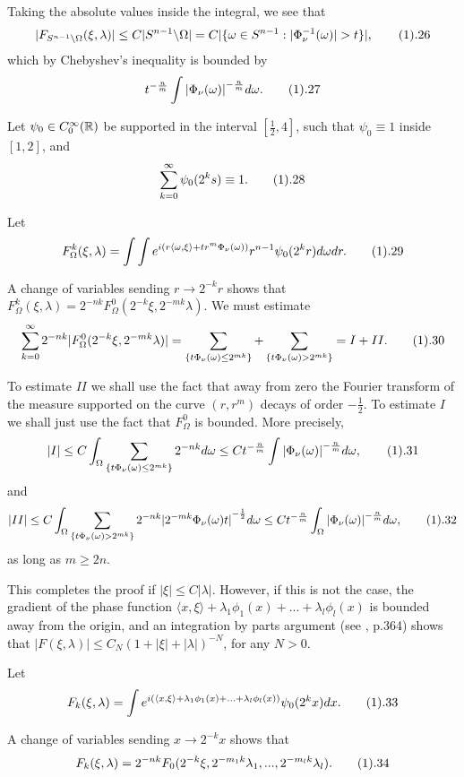 Taking the absolute values inside the integral, we see that
$$ |F_{S^{n-1}\backslash \Omega} (\xi,\lambda)| \leq 
C|S^{n-1}\backslash \Omega|=C|\{\omega \in S^{n-1}: 
|{\Phi}_{\nu}^{-1}(\omega)|>t\}|, \tag1.26$$ which by Chebyshev's 
inequality is bounded by 
$$ t^{-\frac{n}{m}} \int {|{\Phi}_{\nu}(\omega)|}^{-\frac{n}{m}} d\omega. 
\tag1.27$$  

Let ${\psi}_0\in C^{\infty}_0({\Bbb R})$ be supported in the interval 
$[\frac{1}{2}, 4]$, such that ${\psi}_0 \equiv 1$ inside $[1,2]$, and 
$$ \sum_{k=0}^{\infty} {\psi}_0(2^ks) \equiv 1. \tag1.28$$ 

Let 
$$F^{k}_{\Omega}(\xi,\lambda)=\int \int e^{i(r\langle \omega, \xi \rangle +
tr^m{\Phi}_{\nu}(\omega))} r^{n-1} {\psi}_0(2^kr) d\omega dr. \tag1.29$$ 

A change of variables sending $r \rightarrow 2^{-k}r$ shows that 
$F^{k}_{\Omega}(\xi,\lambda)=2^{-nk}F^{0}_{\Omega}(2^{-k}\xi, 2^{-mk}\lambda).$
We must estimate 
$$\sum_{k=0}^{\infty}2^{-nk}|F^{0}_{\Omega}(2^{-k}\xi, 2^{-mk}\lambda)|=
\sum_{\{t{\Phi}_{\nu}(\omega) \leq 2^{mk}\}} 
+\sum_{\{t{\Phi}_{\nu}(\omega)>2^{mk}\}}=I+II. \tag1.30$$ 

To estimate $II$ we shall use the fact that away from zero the Fourier transform
of the measure supported on the curve $(r,r^m)$ decays of order $-\frac{1}{2}$. To
estimate $I$ we shall just use the fact that $F^{0}_{\Omega}$ is bounded. More 
precisely, 
$$ |I| \leq C \int_{\Omega}  
\sum_{\{t{\Phi}_{\nu}(\omega)\leq 2^{mk}\}} 2^{-nk} d\omega \leq
C t^{-\frac{n}{m}} \int {|{\Phi}_{\nu}(\omega)|}^{-\frac{n}{m}} d\omega, 
\tag1.31$$  and
$$ |II| \leq C \int_{\Omega}  \sum_{\{t{\Phi}_{\nu}(\omega)>2^{mk}\}} 
2^{-nk} {|2^{-mk}{\Phi}_{\nu}(\omega)t|}^{-\frac{1}{2}}  d\omega \leq 
Ct^{-\frac{n}{m}} \int_{\Omega} 
{|{\Phi}_{\nu}(\omega)|}^{-\frac{n}{m}} d\omega, \tag1.32$$
as long as $m\ge2n$. 

This completes the proof if $|\xi| \leq C|\lambda|$. However, if this is not the
case, the gradient of the phase function 
$\langle x, \xi \rangle +{\lambda}_1{\phi}_1(x)+...+ {\lambda}_l{\phi}_l(x)$ is
bounded away from the origin, and an integration by parts argument  
(see \cite{St}, p.364) shows that 
$|F(\xi,\lambda)| \leq C_N{(1+|\xi|+|\lambda|)}^{-N}$, for any $N>0$. 
\enddemo 

 Let 
$$F_k(\xi,\lambda)=\int e^{i(\langle x,\xi \rangle +{\lambda}_1{\phi}_1(x)+ 
...+ {\lambda}_l{\phi}_l(x))} {\psi}_0(2^kx)dx. \tag1.33$$ 

A change of variables sending $x \rightarrow 2^{-k}x$ shows that 
$$F_k(\xi,\lambda)=2^{-nk}F_0(2^{-k}\xi, 2^{-m_1k}{\lambda}_1,..., 
2^{-m_lk}{\lambda}_l). \tag1.34$$ 

